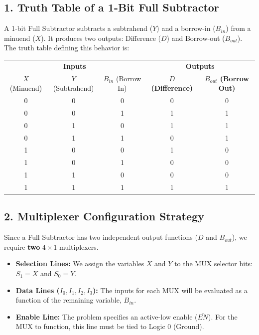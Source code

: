 \documentclass[12pt,a3paper]{article}
\begin{document}
\begin{enumerate}
\begin{tcolorbox}[enhanced,breakable,ansbox,colback=cD!4,colframe=cD,boxrule=0.8pt,arc=5pt,title={\textbf{Answer}},fonttitle=\bfseries\color{white},colbacktitle=cD]

\subsection*{1. Truth Table of a 1-Bit Full Subtractor}
A 1-bit Full Subtractor subtracts a subtrahend ($Y$) and a borrow-in ($B_{in}$) from a minuend ($X$). It produces two outputs: Difference ($D$) and Borrow-out ($B_{out}$). The truth table defining this behavior is:

\begin{center}
\renewcommand{\arraystretch}{1.2}
\begin{tabular}{ccc | cc}
\toprule
\multicolumn{3}{c|}{\textbf{Inputs}} & \multicolumn{2}{c}{\textbf{Outputs}} \\
$X$ (Minuend) & $Y$ (Subtrahend) & $B_{in}$ (Borrow In) & \textbf{$D$ (Difference)} & \textbf{$B_{out}$ (Borrow Out)} \\
\midrule
0 & 0 & 0 & 0 & 0 \\
0 & 0 & 1 & 1 & 1 \\
\midrule
0 & 1 & 0 & 1 & 1 \\
0 & 1 & 1 & 0 & 1 \\
\midrule
1 & 0 & 0 & 1 & 0 \\
1 & 0 & 1 & 0 & 0 \\
\midrule
1 & 1 & 0 & 0 & 0 \\
1 & 1 & 1 & 1 & 1 \\
\bottomrule
\end{tabular}
\end{center}

\vspace{0.2cm}
\subsection*{2. Multiplexer Configuration Strategy}
Since a Full Subtractor has two independent output functions ($D$ and $B_{out}$), we require \textbf{two} $4 \times 1$ multiplexers. 
\begin{itemize}
    \item \textbf{Selection Lines:} We assign the variables $X$ and $Y$ to the MUX selector bits: $S_1 = X$ and $S_0 = Y$.
    \item \textbf{Data Lines ($I_0, I_1, I_2, I_3$):} The inputs for each MUX will be evaluated as a function of the remaining variable, $B_{in}$.
    \item \textbf{Enable Line:} The problem specifies an active-low enable ($\overline{EN}$). For the MUX to function, this line must be tied to Logic $0$ (Ground).
\end{itemize}


\end{tcolorbox}
\end{enumerate}
\end{document}
